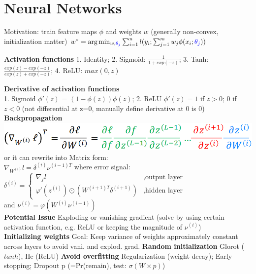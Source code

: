 \section{Neural Networks}
Motivation: train feature maps $\phi$ and weights $w$ (generally non-convex, initialization matter) $w^* = \arg \min_{w, \textcolor{blue}{\theta_j}} \sum^n_{i=1}l(y_i; \sum^m_{j=1}{w_j}{\phi(x_i;\textcolor{blue}{\theta_j})})$

\textbf{Activation functions}
1. Identity; 2. Sigmoid: $\frac{1}{1+exp(-z)}$; 3. Tanh: $\frac{exp(z)-exp(-z)}{exp(z)+exp(-z)}$; 4. ReLU: $max(0, z)$ 

\textbf{Derivative of activation functions} \\
1. Sigmoid $\phi'(z)$ = $(1-\phi(z))\phi(z)$; 2. ReLU $\phi'(z) = 1$ if $z>0$; $0$ if $z<0$ (not differential at z=0, manually define derivative at 0 is 0)\\
\textbf{Backpropagation}
\includegraphics[width=\linewidth]{pics/figure9.PNG}
or it can rewrite into Matrix form:\\
$\nabla_{W^{(i)}}l = \delta^{(i)}\nu^{(i-1)T}$ where  error signal: \\ $\delta^{(i)} = 
\begin{cases}
\nabla_f l&, \text{output layer}\\
\varphi'(z^{(i)}) \odot (W^{(i+1)T}\delta^{(i+1)})&, \text{hidden layer}
\end{cases}$\\
and $\nu^{(i)} = \varphi(W^{(i)}\nu^{(i-1)})$\\
\textbf{Potential Issue}
Exploding or vanishing gradient (solve by using certain activation function, e.g. ReLU or keeping the magnitude of $\nu^{(i)}$)\\
\textbf{Initializing weights}
Goal: Keep variance of weights approximately constant across layers to avoid vani. and explod. grad. 
\textbf{Random initialization} 
Glorot ($tanh$), He (ReLU)
\textbf{Avoid overfitting}
Regularization (weight decay); Early stopping; Dropout p (=Pr(remain), test: $\sigma(W \times p)$)



